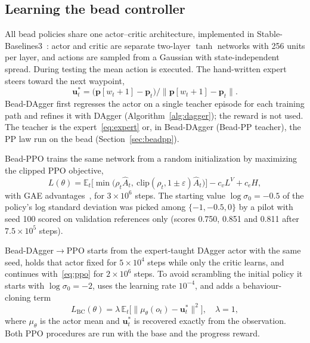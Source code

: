 \documentclass[10pt,twocolumn,twoside]{article}
\newcommand{\dpo}{DAgger$\to$PPO}
\begin{document}
\subsection{Learning the bead controller}

All bead policies share one actor--critic architecture, implemented in
Stable-Baselines3~\cite{raffin2021sb3}: actor and critic are separate two-layer
$\tanh$ networks with 256 units per layer, and actions are sampled from a Gaussian
with state-independent spread. During testing the mean action is
executed. The hand-written expert steers toward the next waypoint,
\begin{equation}
\mathbf{u}^{*}_t=\big(\mathbf{p}[w_t+1]-\mathbf{p}_t\big)\big/\big\|\mathbf{p}[w_t+1]-\mathbf{p}_t\big\|.
\label{eq:expert}
\end{equation}
Bead-DAgger first regresses the actor on a single teacher episode for each
training path and refines it with DAgger (Algorithm~\ref{alg:dagger}); the reward is not used. The teacher
is the expert~\eqref{eq:expert} or, in Bead-DAgger (Bead-PP teacher), the PP law
run on the bead (Section~\ref{sec:beadpp}).

Bead-PPO trains the same network from a random initialization by maximizing the
clipped PPO objective,
\begin{equation}
L(\theta)=\mathbb{E}_t\big[\min\big(\rho_t\hat A_t,\ \mathrm{clip}(\rho_t,1\pm\varepsilon)\hat A_t\big)\big]-c_vL^{V}+c_eH,
\label{eq:ppo}
\end{equation}
with GAE advantages~\cite{schulman2016gae}, for $3\times10^{6}$ steps. The
starting value $\log\sigma_0=-0.5$ of the policy's log standard deviation was
picked among $\{-1,-0.5,0\}$ by a pilot with seed 100 scored on validation
references only (scores 0.750, 0.851 and 0.811 after $7.5\times10^{5}$ steps).

Bead-\dpo{} starts from the expert-taught DAgger actor with the same seed,
holds that actor fixed for $5\times10^{4}$ steps while only the critic learns,
and continues with~\eqref{eq:ppo} for $2\times10^{6}$ steps. To avoid scrambling the initial
policy it starts with $\log\sigma_0=-2$, uses the learning rate $10^{-4}$, and
adds a behaviour-cloning term
\begin{equation}
L_{\mathrm{BC}}(\theta)=\lambda\,\mathbb{E}_t\big[\|\mu_\theta(o_t)-\mathbf{u}^{*}_t\|^2\big],\quad\lambda=1,
\label{eq:bc}
\end{equation}
where $\mu_\theta$ is the actor mean and $\mathbf{u}^{*}_t$ is recovered exactly
from the observation. Both PPO procedures are run with the base and the
progress reward.
\end{document}
